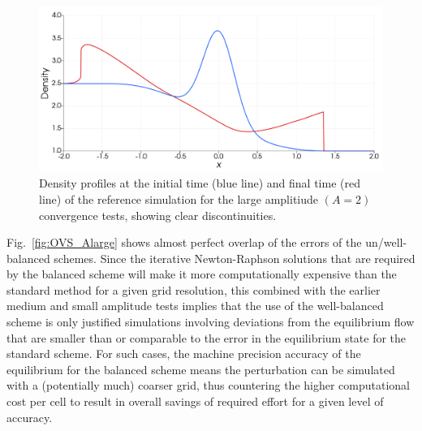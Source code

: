 \begin {figure}
\centering
\includegraphics[width=13cm]{figures/OVSeps2profile}
\caption {Density profiles at the initial time (blue line) and final time (red line) of the reference simulation for the large amplitiude $(A=2)$ convergence tests, showing clear discontinuities.}
\label{fig:OVS_Alarge_profile}
\end{figure}

Fig.~\ref{fig:OVS_Alarge} shows almost perfect overlap of the errors of the un/well-balanced schemes. Since the iterative Newton-Raphson solutions that are required by the balanced scheme will make it more computationally expensive than the standard method for a given grid resolution, this combined with the earlier medium and small amplitude tests implies that the use of the well-balanced scheme is only justified simulations involving deviations from the equilibrium flow that are smaller than or comparable to the error in the equilibrium state for the standard scheme. For such cases, the machine precision accuracy of the equilibrium for the balanced scheme means the perturbation can be simulated with a (potentially much) coarser grid, thus countering the higher computational cost per cell to result in overall savings of required effort for a given level of accuracy.

